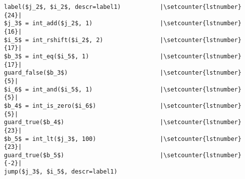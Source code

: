 \begin{lstlisting}[mathescape, numbers=right, escapechar=|, firstnumber=-1]
label($j_2$, $i_2$, descr=label1)           |\setcounter{lstnumber}{24}|
$j_3$ = int_add($j_2$, 1)                   |\setcounter{lstnumber}{16}|
$i_5$ = int_rshift($i_2$, 2)                |\setcounter{lstnumber}{17}|
$b_3$ = int_eq($i_5$, 1)                    |\setcounter{lstnumber}{17}|
guard_false($b_3$)                          |\setcounter{lstnumber}{5}|
$i_6$ = int_and($i_5$, 1)                   |\setcounter{lstnumber}{5}|
$b_4$ = int_is_zero($i_6$)                  |\setcounter{lstnumber}{5}|
guard_true($b_4$)                           |\setcounter{lstnumber}{23}|
$b_5$ = int_lt($j_3$, 100)                  |\setcounter{lstnumber}{23}|
guard_true($b_5$)                           |\setcounter{lstnumber}{-2}|
jump($j_3$, $i_5$, descr=label1)
\end{lstlisting}
